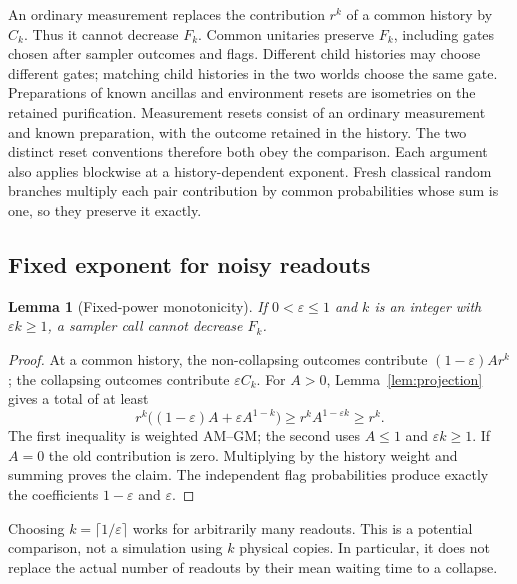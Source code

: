 \documentclass[11pt]{article}
\newtheorem{lemma}[theorem]{Lemma}
\theoremstyle{remark}
\newcommand{\eps}{\varepsilon}
\begin{document}
An ordinary measurement replaces the contribution $r^k$ of a common
history by $C_k$. Thus it cannot decrease $F_k$. Common unitaries preserve
$F_k$, including gates chosen after sampler outcomes and flags. Different
child histories may choose different gates; matching child histories in the
two worlds choose the same gate.
Preparations of known ancillas and environment resets are isometries on the
retained purification. Measurement resets consist of an ordinary measurement
and known preparation, with the outcome retained in the history. The two
distinct reset conventions therefore both obey the comparison. Each argument
also applies blockwise at a history-dependent exponent. Fresh classical
random branches multiply each pair contribution by common probabilities
whose sum is one, so they preserve it exactly.

\subsection{Fixed exponent for noisy readouts}
\begin{lemma}[Fixed-power monotonicity]\label{lem:fixed}
If $0<\eps\le1$ and $k$ is an integer with $\eps k\ge1$, a sampler call
cannot decrease $F_k$.
\end{lemma}
\begin{proof}
At a common history, the non-collapsing outcomes contribute
$(1-\eps)Ar^k$; the collapsing outcomes contribute $\eps C_k$.
For $A>0$, Lemma~\ref{lem:projection} gives a total of at least
\begin{equation}\label{eq:fixed}
 r^k\bigl((1-\eps)A+\eps A^{1-k}\bigr)
 \ge r^k A^{1-\eps k}\ge r^k.
\end{equation}
The first inequality is weighted AM--GM; the second uses $A\le1$ and
$\eps k\ge1$. If $A=0$ the old contribution is zero. Multiplying by the
history weight and summing proves the claim. The independent flag
probabilities produce exactly the coefficients $1-\eps$ and $\eps$.
\end{proof}

Choosing $k=\lceil1/\eps\rceil$ works for arbitrarily many readouts.
This is a potential comparison, not a simulation using $k$ physical copies.
In particular, it does not replace the actual number of readouts by their
mean waiting time to a collapse.
\end{document}
